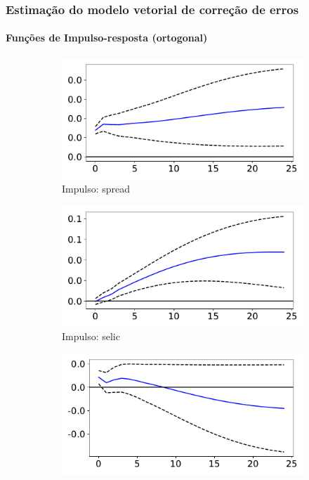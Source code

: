 \documentclass{beamer}
\begin{document}
\begin{frame}
    \frametitle{Estimação do modelo vetorial de correção de erros}
    \framesubtitle{Funções de Impulso-resposta (ortogonal)}
    \begin{figure}[!hbt]
        \begin{subfigure}[t]{.4\linewidth}
            \includegraphics[width = \textwidth, scale=1]{irf/orth_spread_spread.pdf}
            \caption{Impulso: spread}
        \end{subfigure}
        \begin{subfigure}[t]{.4\linewidth}
            \includegraphics[width = \textwidth, scale=1]{irf/orth_spread_selic.pdf}
            \caption{Impulso: selic}
        \end{subfigure}
        \begin{subfigure}[t]{.4\linewidth}
            \includegraphics[width = \textwidth, scale=1]{irf/orth_spread_inad.pdf}

\end{subfigure}
\end{figure}
\end{frame}
\end{document}
